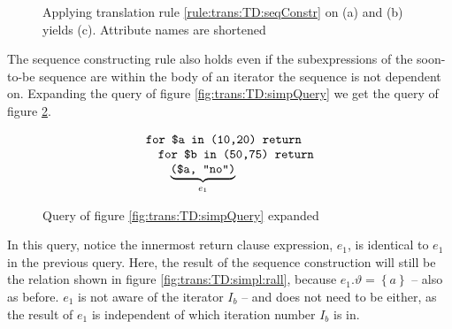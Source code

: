 \begin{myExample}
\begin{figure}[!h]
\centering
{}
\qquad
{}
\qquad
{}

\caption[Example: constructing a sequence]{Applying translation rule \ref{rule:trans:TD:seqConstr} on (a) and (b)
yields (c). Attribute names are shortened \label{fig:trans:TD:simpleSeq}}
\end{figure}

The sequence constructing rule also holds even if the subexpressions of the soon-to-be sequence are within the
body of an iterator the sequence is not dependent on. Expanding the query of
figure \ref{fig:trans:TD:simpQuery} we get the query of figure \ref{fig:trans:TD:expandQuery}. 
\begin{figure}[h]
\begin{equation*}
\begin{array}{l}
\mbox{\texttt{for \$a in (10,20) return}} \\ \quad
\mbox{\texttt{for \$b in (50,75) return}} \\ \quad \quad
\underbrace{ \mbox{\texttt{(\$a, "no")}} }_{e_{1}}
\end{array}
\end{equation*}
\caption{Query of figure \ref{fig:trans:TD:simpQuery} expanded}
\label{fig:trans:TD:expandQuery}
\end{figure}
In this query, notice the innermost return clause expression, $e_{1}$, is identical to $e_{1}$ in the previous
query. Here, the result of the sequence construction will still be the relation shown in figure
\ref{fig:trans:TD:simpl:rall}, because $e_{1}.\vartheta=\left\{a\right\}$ -- also as before. $e_{1}$ is not aware
of the iterator $I_{b}$ -- and does not need to be either, as the result of $e_{1}$ is independent of which
iteration number $I_{b}$ is in.

\end{myExample}
